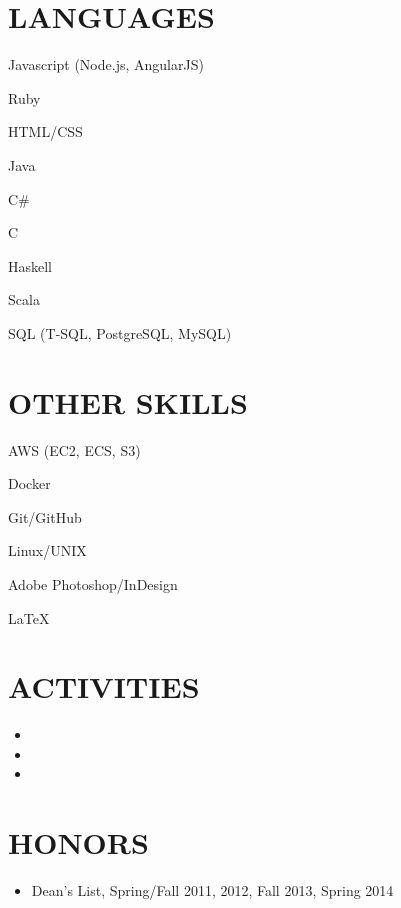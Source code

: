 \documentclass[margin]{res}
\begin{document}
\begin{resume}
    \section{LANGUAGES}
      \begin{itemize*}[itemjoin=\hspace{5pt}]
        \item Javascript (Node.js, AngularJS)
        \item Ruby
        \item HTML/CSS
        \item Java
        \item C\#
        \item C
        \item Haskell
        \item Scala
        \item SQL (T-SQL, PostgreSQL, MySQL)
      \end{itemize*}


    \section{OTHER SKILLS}
      \begin{itemize*}[itemjoin=\hspace{5pt}]
        \item AWS (EC2, ECS, S3)
        \item Docker
        \item Git/GitHub
        \item Linux/UNIX
        \item Adobe Photoshop/InDesign
        \item \LaTeX
      \end{itemize*}


    \section{ACTIVITIES}
    \begin{itemize}
      \item {}
      \item {}
      \item {}
    \end{itemize}


    \section{HONORS}
    \begin{itemize}
      \item Dean's List, Spring/Fall 2011, 2012, Fall 2013, Spring 2014
    \end{itemize}


    \hspace{84pt}\printavailability %
  \end{resume}
\end{document}
